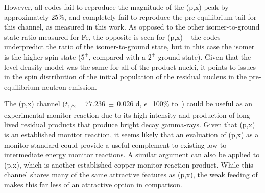 However, all codes fail to reproduce the magnitude of the (p,x) peak by approximately 25\%, and completely fail to reproduce the pre-equilibrium tail for this channel, as measured in this work. 
As opposed to the other isomer-to-ground state ratio measured for Fe,  the opposite is seen for (p,x) -- the codes underpredict the ratio of the isomer-to-ground state, but in this case the isomer is the higher spin state ($5^+$, compared with a  $2^+$ ground state).
Given that the level density model was the same for all of the product nuclei, it points to issues in  the spin distribution of the initial population of the residual nucleus 
in the pre-equilibrium neutron emission.








The (p,x) channel ($t_{1/2}=77.236~\pm~0.026$ d, $\epsilon$=100\% to \,\cite{Junde2011})
could be useful as an experimental monitor reaction  due to its high intensity and production of long-lived residual products that produce bright decay gamma-rays. 
Given that (p,x) is an established monitor reaction, it seems likely that an evaluation of (p,x) as a monitor standard could provide a useful complement to existing low-to-intermediate energy monitor reactions.
A similar argument can also be applied to (p,x), which is another established copper monitor reaction product.
While this channel shares many of the same attractive features as (p,x), the weak feeding of  makes this far less of an attractive option in comparison.






